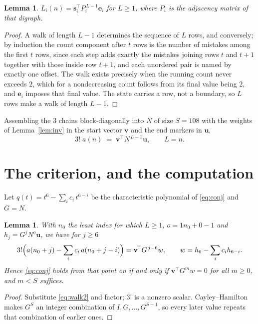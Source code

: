 \documentclass[11pt,a4paper]{article}
\theoremstyle{plain}
\newtheorem{lemma}[theorem]{Lemma}
\theoremstyle{definition}
\begin{document}
\begin{lemma}\label{lem:walk}
$L_i(n)=\mathbf{s}_i^{\!\top}P_i^{\,L-1}\mathbf{e}_i$ for $L\ge1$, where $P_i$ is the
adjacency matrix of that digraph.
\end{lemma}

\begin{proof}
A walk of length $L-1$ determines the sequence of $L$ rows, and conversely; by induction
the count component after $t$ rows is the number of mistakes among the first $t$ rows,
since each step adds exactly the mistakes joining rows $t$ and $t+1$ together with those
inside row $t+1$, and each unordered pair is named by exactly one offset. The walk exists
precisely when the running count never exceeds $2$, which for a nondecreasing count follows
from its final value being $2$, and $\mathbf{e}_i$ imposes that final value. The state
carries a row, not a boundary, so $L$ rows make a walk of length $L-1$.
\end{proof}

Assembling the $3$ chains block-diagonally into $N$ of size $S=108$ with the weights of
Lemma~\ref{lem:inv} in the start vector $\mathbf{v}$ and the end markers in
$\mathbf{u}$,
\begin{equation}\label{eq:walk2}
3!\;a(n)\;=\;\mathbf{v}^{\!\top}N^{\,L-1}\mathbf{u},\qquad L=n .
\end{equation}

\section{The criterion, and the computation}

Let $q(t)=t^{6}-\sum_i c_i\,t^{6-i}$ be the characteristic polynomial of
\eqref{eq:conj} and $G=N$.

\begin{lemma}\label{lem:crit}
With $n_0$ the least index for which $L\ge1$, $o=1n_0+0-1$ and
$h_j=G^{j}N^{o}\mathbf{u}$, we have for $j\ge6$
\[
3!\Bigl(a(n_0+j)-\sum_i c_i\,a(n_0+j-i)\Bigr)=\mathbf{v}^{\!\top}G^{\,j-6}w,
\qquad w=h_{6}-\sum_i c_ih_{6-i} .
\]
Hence \eqref{eq:conj} holds from that point on if and only if
$\mathbf{v}^{\!\top}G^{m}w=0$ for all $m\ge0$, and $m<S$ suffices.
\end{lemma}

\begin{proof}
Substitute \eqref{eq:walk2} and factor; $3!$ is a nonzero scalar. Cayley--Hamilton
makes $G^{S}$ an integer combination of $I,G,\dots,G^{S-1}$, so every later value repeats
that combination of earlier ones.
\end{proof}
\end{document}
